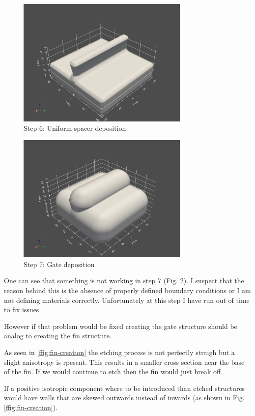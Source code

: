 \begin{figure}[H]
	\centering
	\includegraphics[width=0.75\textwidth]{res/task3_6_spacerDeposition.png}
	\caption{Step 6: Uniform spacer deposition}
    \label{fig:spacer-deposition}
\end{figure}


\begin{figure}[H]
	\centering
	\includegraphics[width=0.75\textwidth]{res/task3_7_gateDeposition.png}
	\caption{Step 7: Gate deposition}
    \label{fig:gate-deposition}
\end{figure}

One can see that something is not working in step 7 (Fig. \ref{fig:gate-deposition}).
I suspect that the reason behind this is the absence of properly defined boundary conditions or I am not defining materials correctly.
Unfortunately at this step I have run out of time to fix issues.

However if that problem would be fixed creating the gate structure should be analog to creating the fin structure.

As seen in \ref{ffig:fin-creation} the etching process is not perfectly straigh but a slight anisotropy is rpesent.
This results in a smaller cross section near the base of the fin. If we would continue to etch then the fin would just break off.

If a positive isotropic component where to be introduced than etched structures would have walls that are skewed outwards instead of inwards (as shown in Fig. \ref{ffig:fin-creation}).





